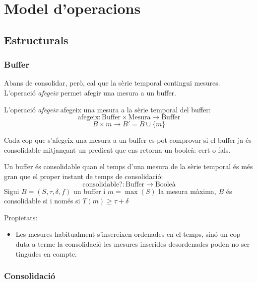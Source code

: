 \section{Model d'operacions}


\subsection{Estructurals}

\subsubsection{Buffer}


Abans de consolidar, però, cal que la sèrie temporal contingui mesures. L'operació \emph{afegeix} permet afegir una mesura a un buffer.

\begin{definition}
  L'operació \emph{afegeix} afegeix una mesura a la sèrie temporal del buffer:
  \[
  \text{afegeix}: \text{Buffer} \times \text{Mesura} \longrightarrow \text{Buffer}
  \]
  \[
   B \times m \longrightarrow B'= B \cup \{m\}
   \]
\end{definition}

Cada cop que s'afegeix una mesura a un buffer es pot comprovar si el buffer ja és consolidable mitjançant un predicat que ens retorna un booleà: cert o fals. 

\begin{definition}
  Un buffer és consolidable quan el temps d'una mesura de la sèrie temporal és més gran que el proper instant de temps de consolidació:
  \[
  \text{consolidable?}: \text{Buffer} \longrightarrow \text{Booleà}
  \]
  Sigui $B=(S,\tau,\delta,f)$ un buffer i $m=\max(S)$ la mesura màxima, $B$ és consolidable si i només si $T(m) \geq \tau+\delta$
\end{definition}



Propietats:

\begin{itemize}
\item Les mesures habitualment s'insereixen ordenades en el temps,
  sinó un cop duta a terme la consolidació les mesures inserides
  desordenades poden no ser tingudes en compte.
\end{itemize}



\subsubsection{Consolidació}

